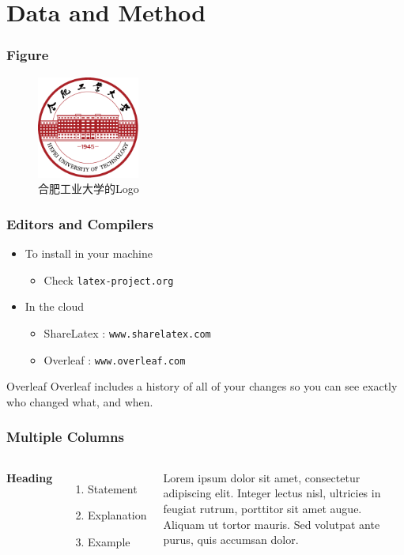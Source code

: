 \documentclass[aspectratio=169]{beamer}
\begin{document}
\section{Data and Method}

\begin{frame}
\frametitle{Figure}
\vspace{-0.3cm}
\begin{figure}[h]
\centering
\includegraphics[width=0.3\textwidth]{images/HFUT_badge.pdf}
\caption{合肥工业大学的Logo}
\end{figure}
\end{frame}


\begin{frame}
\frametitle{Editors and Compilers}
\begin{itemize}
\item To install in your machine
\begin{itemize}
\item Check \texttt{latex-project.org}
\end{itemize}
\item In the cloud
\begin{itemize}
\item ShareLatex : \texttt{www.sharelatex.com}
\item Overleaf : \texttt{www.overleaf.com}
\end{itemize}
\end{itemize}
\vskip 1cm
\begin{block}{Overleaf}
    Overleaf includes a history of all of your changes so you can see exactly who changed what, and when. 
\end{block}
\end{frame}


\begin{frame}
\frametitle{Multiple Columns}
\begin{columns}[c]
\textbf{Heading}
\begin{enumerate}
\item Statement
\item Explanation
\item Example
\end{enumerate}
Lorem ipsum dolor sit amet, consectetur adipiscing elit. Integer lectus nisl, ultricies in feugiat rutrum, porttitor sit amet augue. Aliquam ut tortor mauris. Sed volutpat ante purus, quis accumsan dolor.
\end{columns}
\end{frame}
\end{document}
